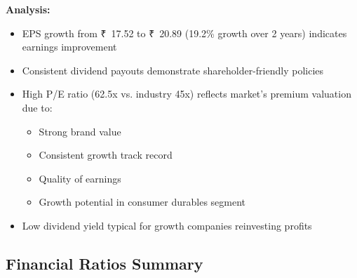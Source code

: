\documentclass[12pt,a4paper]{article}
\newcommand{\rupee}{₹}
\begin{document}
\textbf{Analysis:}
\begin{itemize}
    \item EPS growth from \rupee~17.52 to \rupee~20.89 (19.2\% growth over 2 years) indicates earnings improvement
    \item Consistent dividend payouts demonstrate shareholder-friendly policies
    \item High P/E ratio (62.5x vs. industry 45x) reflects market's premium valuation due to:
    \begin{itemize}
        \item Strong brand value
        \item Consistent growth track record
        \item Quality of earnings
        \item Growth potential in consumer durables segment
    \end{itemize}
    \item Low dividend yield typical for growth companies reinvesting profits
\end{itemize}

\subsection{Financial Ratios Summary}
\end{document}
